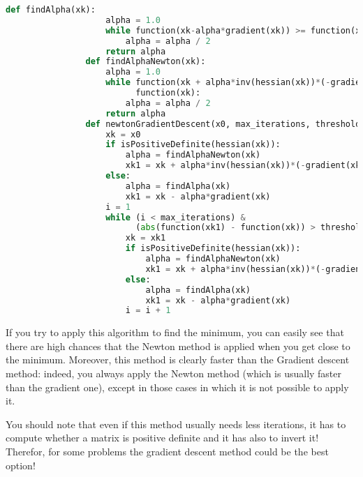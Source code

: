             \begin{lstlisting}[language=Python]
                def findAlpha(xk):
                    alpha = 1.0
                    while function(xk-alpha*gradient(xk)) >= function(xk):
                        alpha = alpha / 2
                    return alpha
                def findAlphaNewton(xk):
                    alpha = 1.0
                    while function(xk + alpha*inv(hessian(xk))*(-gradient(xk))) >
                          function(xk):
                        alpha = alpha / 2
                    return alpha
                def newtonGradientDescent(x0, max_iterations, threshold):
                    xk = x0
                    if isPositiveDefinite(hessian(xk)):
                        alpha = findAlphaNewton(xk)
                        xk1 = xk + alpha*inv(hessian(xk))*(-gradient(xk))
                    else:
                        alpha = findAlpha(xk)
                        xk1 = xk - alpha*gradient(xk)
                    i = 1
                    while (i < max_iterations) &
                          (abs(function(xk1) - function(xk)) > threshold):
                        xk = xk1
                        if isPositiveDefinite(hessian(xk)):
                            alpha = findAlphaNewton(xk)
                            xk1 = xk + alpha*inv(hessian(xk))*(-gradient(xk))
                        else:
                            alpha = findAlpha(xk)
                            xk1 = xk - alpha*gradient(xk)
                        i = i + 1
            \end{lstlisting}
            If you try to apply this algorithm to find the minimum, you can easily see that there are high chances that the Newton method is applied when you get close to the minimum. Moreover, this method is clearly faster than the Gradient descent method: indeed, you always apply the Newton method (which is usually faster than the gradient one), except in those cases in which it is not possible to apply it.\par
            You should note that even if this method usually needs less iterations, it has to compute whether a matrix is positive definite and it has also to invert it! Therefor, for some problems the gradient descent method could be the best option!